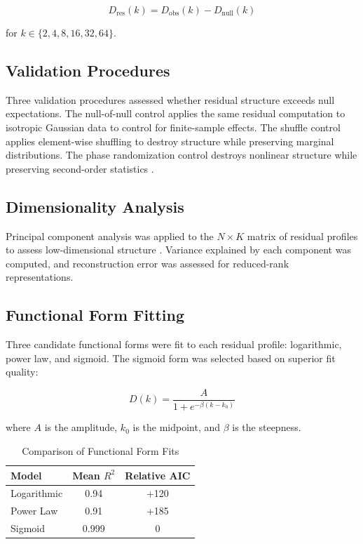 \begin{equation}
	D_{\text{res}}(k) = D_{\text{obs}}(k) - D_{\text{null}}(k)
\end{equation}

for $k \in \{2, 4, 8, 16, 32, 64\}$.

\subsection{Validation Procedures}

Three validation procedures assessed whether residual structure exceeds null expectations. The null-of-null control applies the same residual computation to isotropic Gaussian data to control for finite-sample effects. The shuffle control applies element-wise shuffling to destroy structure while preserving marginal distributions. The phase randomization control destroys nonlinear structure while preserving second-order statistics \citep{coifman2006diffusion}.

\subsection{Dimensionality Analysis}

Principal component analysis was applied to the $N \times K$ matrix of residual profiles to assess low-dimensional structure \citep{jolliffe2002principal}. Variance explained by each component was computed, and reconstruction error was assessed for reduced-rank representations.

\subsection{Functional Form Fitting}

Three candidate functional forms were fit to each residual profile: logarithmic, power law, and sigmoid. The sigmoid form was selected based on superior fit quality:

\begin{equation}
	D(k) = \frac{A}{1 + e^{-\beta(k - k_0)}}
\end{equation}

where $A$ is the amplitude, $k_0$ is the midpoint, and $\beta$ is the steepness.

\begin{table}[H]
	\centering
	\begin{tabular}{lcc}
		\toprule
		\textbf{Model} & \textbf{Mean } $R^2$ & \textbf{Relative AIC} \\
		\midrule
		Logarithmic    & 0.94                 & +120                  \\
		Power Law      & 0.91                 & +185                  \\
		Sigmoid        & 0.999                & 0                     \\
		\bottomrule
	\end{tabular}
	\caption{Comparison of Functional Form Fits}
	\label{tab:model_comparison}
\end{table}

